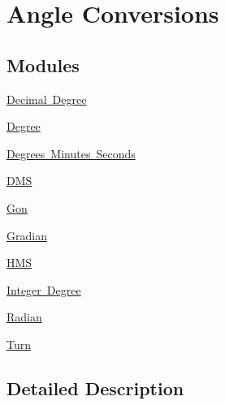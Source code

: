 \hypertarget{group___e_g_x_math-_angle_conversions}{}\section{Angle Conversions}
\label{group___e_g_x_math-_angle_conversions}
\subsection*{Modules}
\begin{DoxyCompactItemize}
\item 
\mbox{\hyperlink{group___e_g_x_math-_angle_conversions-_decimal_degree}{Decimal Degree}}
\item 
\mbox{\hyperlink{group___e_g_x_math-_angle_conversions-_degree}{Degree}}
\item 
\mbox{\hyperlink{group___e_g_x_math-_angle_conversions-_degrees_minutes_seconds}{Degrees Minutes Seconds}}
\item 
\mbox{\hyperlink{group___e_g_x_math-_angle_conversions-_d_m_s}{D\+MS}}
\item 
\mbox{\hyperlink{group___e_g_x_math-_angle_conversions-_gon}{Gon}}
\item 
\mbox{\hyperlink{group___e_g_x_math-_angle_conversions-_gradian}{Gradian}}
\item 
\mbox{\hyperlink{group___e_g_x_math-_angle_conversions-_h_m_s}{H\+MS}}
\item 
\mbox{\hyperlink{group___e_g_x_math-_angle_conversions-_integer_degree}{Integer Degree}}
\item 
\mbox{\hyperlink{group___e_g_x_math-_angle_conversions-_radian}{Radian}}
\item 
\mbox{\hyperlink{group___e_g_x_math-_angle_conversions-_turn}{Turn}}
\end{DoxyCompactItemize}


\subsection{Detailed Description}
